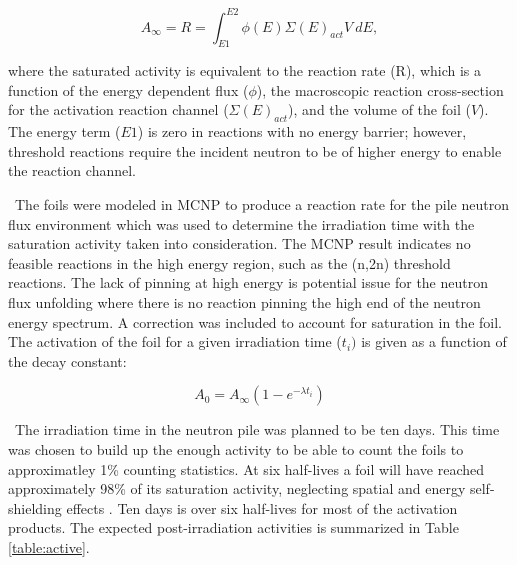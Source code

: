 \documentclass[journal]{IEEEtran}
\begin{document}
	\begin{equation} \label{eq:InfReactionRate}
	A_{\infty} = R = \int_{E1}^{E2} \phi(E) \Sigma(E)_{act} V
	\:dE ,
	\end{equation}
	
	\noindent where the saturated activity is equivalent to the reaction rate (R), which is a function of the energy dependent flux ($\phi$), the macroscopic reaction cross-section for the activation reaction channel ($\Sigma(E)_{act}$), and the volume of the foil ($V$). The energy term ($E1$) is zero in reactions with no energy barrier; however, threshold reactions require the incident neutron to be of higher energy to enable the reaction channel. 
	
	\ The foils were modeled in MCNP to produce a reaction rate for the pile neutron flux environment which was used to determine the irradiation time with the saturation activity taken into consideration. The MCNP result indicates no feasible reactions in the high energy region, such as the (n,2n) threshold reactions. The lack of pinning at high energy is potential issue for the neutron flux unfolding where there is no reaction pinning the high end of the neutron energy spectrum. A correction was included to account for saturation in the foil. The activation of the foil for a given	irradiation time ($t_{i})$ is given as a function of the decay 
	constant: 
	
	\begin{equation} \label{eq:ReactionRate}
	A_{0} = A_{\infty}(1-e^{-\lambda t_{i}}) 
	\end{equation}
	
	\ The irradiation time in the neutron pile was planned to be ten days. This time was chosen to build up the enough activity to be able to count the foils to approximatley 1\% counting statistics. At six half-lives a foil will have reached approximately 98\% of its saturation activity, neglecting spatial and energy self-shielding effects \cite{Knoll}. Ten days is over six half-lives for most of the activation products. The expected post-irradiation activities is summarized in Table \ref{table:active}.  
	
\end{document}
